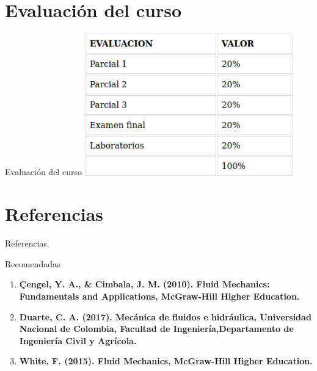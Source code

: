 \documentclass [xcolor=svgnames, t] {beamer}
\begin{document}
\section{Evaluaci\'on del curso}
\begin{frame}{Evaluaci\'on del curso}
\centering
\includegraphics[width=9cm]{eval}
\end{frame}

\section{Referencias}
\begin{frame}{Referencias}
\begin{block}{Recomendadas}
\begin{enumerate}
\item \textbf{Çengel, Y. A., \& Cimbala, J. M. (2010). Fluid Mechanics: Fundamentals and Applications, McGraw-Hill Higher Education.}
\item \textbf{Duarte, C. A. (2017). Mecánica de fluidos e hidráulica, Universidad Nacional de Colombia, Facultad de Ingeniería,Departamento de Ingeniería Civil y Agrícola.}
\item \textbf{White, F. (2015). Fluid Mechanics, McGraw-Hill Higher Education.}
\end{enumerate}
\end{block}
\end{frame}
\end{document}
